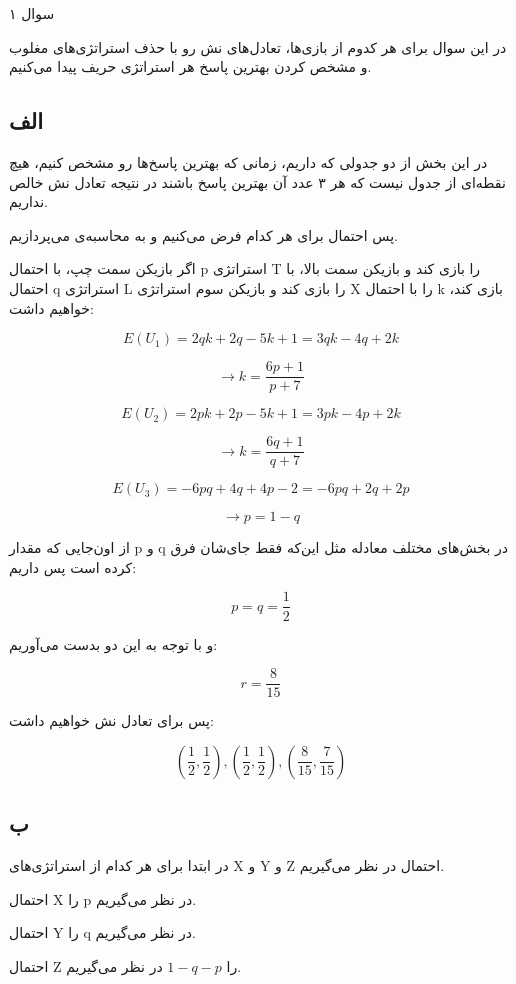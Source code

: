 سوال ۱


در این سوال برای هر کدوم از بازی‌ها، تعادل‌های نش رو با حذف استراتژی‌های مغلوب و مشخص کردن بهترین پاسخ هر استراتژی حریف پیدا می‌کنیم.

\subsection*{الف}

در این بخش از دو جدولی که داریم، زمانی که بهترین پاسخ‌ها رو مشخص کنیم، هیچ نقطه‌ای از جدول نیست که هر ۳ عدد آن بهترین پاسخ باشند در نتیجه تعادل نش خالص نداریم.

پس احتمال برای هر کدام فرض می‌کنیم و به محاسبه‌ی 
می‌پردازیم.

اگر بازیکن سمت چپ، با احتمال p استراتژی T را بازی کند و بازیکن سمت بالا، با احتمال q استراتژی L را بازی کند و بازیکن سوم استراتژی X را با احتمال k بازی کند، خواهیم داشت:

$$
E(U_1) = 2qk + 2q - 5k + 1 = 3qk - 4q + 2k
$$

$$
\rightarrow k = \frac{6p + 1}{p + 7}
$$

$$
E(U_2) = 2pk + 2p - 5k + 1 = 3pk - 4p + 2k
$$

$$
\rightarrow k = \frac{6q + 1}{q + 7}
$$

$$
E(U_3) = -6pq + 4q + 4p - 2 = -6pq + 2q + 2p
$$

$$
\rightarrow p = 1 - q
$$

از اون‌جایی که مقدار p و q در بخش‌های مختلف معادله مثل این‌که فقط جای‌شان فرق کرده است پس داریم:

$$
p = q = \frac{1}{2}
$$

و با توجه به این دو بدست می‌آوریم:

$$
r = \frac{8}{15}
$$

پس برای تعادل نش خواهیم داشت:

$$
{(\frac{1}{2} , \frac{1}{2}) , (\frac{1}{2} , \frac{1}{2}) , (\frac{8}{15} , \frac{7}{15})}
$$

\subsection*{ب}

در ابتدا برای هر کدام از استراتژی‌های X و Y و Z احتمال در نظر می‌گیریم.

احتمال X را p در نظر می‌گیریم.

احتمال Y را q در نظر می‌گیریم.

احتمال Z را 
$1 - q - p$
در نظر می‌گیریم.

